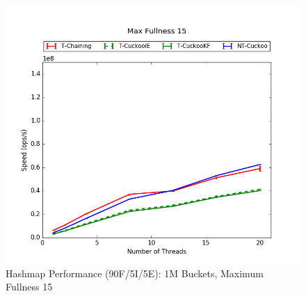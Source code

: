 \begin{figure}[H]
    \centering
	\begin{minipage}{0.5\textwidth}\includegraphics[width=\textwidth]{maps/15HM1M:F90,I5,E5.png} 
    \end{minipage}
	\begin{minipage}{0.4\textwidth}
    
    \end{minipage}
    \caption{Hashmap Performance (90F/5I/5E): 1M Buckets, Maximum Fullness 15}
\end{figure}

